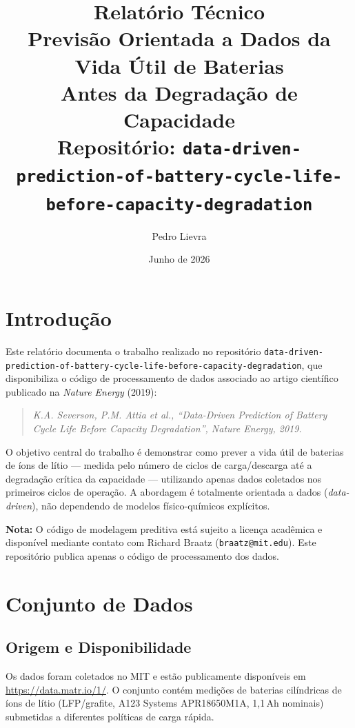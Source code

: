 \documentclass[12pt,a4paper]{article}
\title{
  \vspace{-1cm}
  {\large Relat\'{o}rio T\'{e}cnico} \\[0.5em]
  \textbf{Previs\~ao Orientada a Dados da Vida \'{U}til de Baterias\\
  Antes da Degrada\c{c}\~ao de Capacidade} \\[0.5em]
  {\normalsize Reposit\'{o}rio: \texttt{data-driven-prediction-of-battery-cycle-life-before-capacity-degradation}}
}
\author{Pedro Lievra}
\date{Junho de 2026}
\begin{document}
\maketitle
\thispagestyle{fancy}

\tableofcontents
\newpage

\section{Introdu\c{c}\~ao}

Este relat\'{o}rio documenta o trabalho realizado no reposit\'{o}rio
\texttt{data-driven-prediction-of-battery-cycle-life-before-capacity-degradation},
que disponibiliza o c\'{o}digo de processamento de dados associado ao artigo
cient\'{i}fico publicado na \emph{Nature Energy} (2019):

\begin{quote}
\textit{K.A. Severson, P.M. Attia et al., ``Data-Driven Prediction of Battery
Cycle Life Before Capacity Degradation'', Nature Energy, 2019.}
\end{quote}

O objetivo central do trabalho \'{e} demonstrar como prever a vida \'{u}til de baterias de
\'{i}ons de l\'{i}tio --- medida pelo n\'{u}mero de ciclos de carga/descarga at\'{e} a degrada\c{c}\~ao
cr\'{i}tica da capacidade --- utilizando apenas dados coletados nos primeiros ciclos de
opera\c{c}\~ao. A abordagem \'{e} totalmente orientada a dados (\textit{data-driven}), n\~ao
dependendo de modelos f\'{i}sico-qu\'{i}micos expl\'{i}citos.

\textbf{Nota:} O c\'{o}digo de modelagem preditiva est\'{a} sujeito a licen\c{c}a acad\^{e}mica e
dispon\'{i}vel mediante contato com Richard Braatz (\texttt{braatz@mit.edu}). Este
repositório publica apenas o código de processamento dos dados.

\section{Conjunto de Dados}

\subsection{Origem e Disponibilidade}

Os dados foram coletados no MIT e est\~ao publicamente dispon\'{i}veis em
\url{https://data.matr.io/1/}. O conjunto cont\'{e}m medi\c{c}\~oes de baterias cil\'{i}ndricas
de \'{i}ons de l\'{i}tio (LFP/grafite, A123 Systems APR18650M1A, 1{,}1\,Ah nominais)
submetidas a diferentes pol\'{i}ticas de carga r\'{a}pida.
\end{document}
